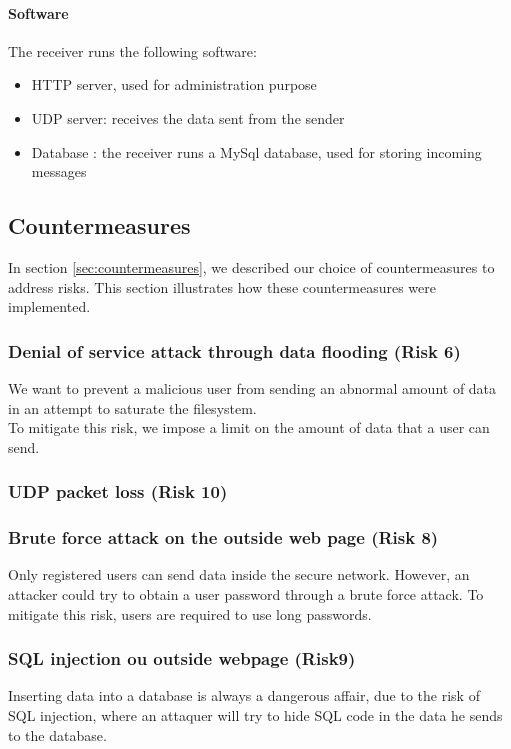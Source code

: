\documentclass[a4paper,11pt]{article}
\begin{document}
\paragraph{Software}
The receiver runs the following software:
\begin{itemize}
	\item{HTTP server, used for administration purpose}
	\item{UDP server: receives the data sent from the sender}
	\item{Database : the receiver runs a MySql database, used for storing incoming messages}
\end{itemize}

\subsection{Countermeasures}
In section \ref{sec:countermeasures}, we described our choice of countermeasures to address risks. This section illustrates how these countermeasures were implemented.

\subsubsection{Denial of service attack through data flooding (Risk 6)}
We want to prevent a malicious user from sending an abnormal amount of data in an attempt to saturate the filesystem.\\

To mitigate this risk, we impose a limit on the amount of data that a user can send.
\subsubsection{UDP packet loss (Risk 10)}


\subsubsection{Brute force attack on the outside web page (Risk 8)}
Only registered users can send data inside the secure network. However, an attacker could try to obtain a user password through a brute force attack. To mitigate this risk, users are required to use long passwords.

\subsubsection{SQL injection ou outside webpage (Risk9)}
Inserting data into a database is always a dangerous affair, due to the risk of SQL injection, where an attaquer will try to hide SQL code in the data he sends to the database.\\
\end{document}
